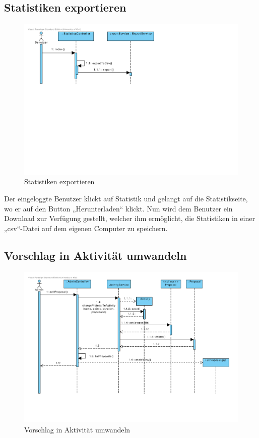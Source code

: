 \subsection{Statistiken exportieren}

\begin{figure}[H]
  \centering
  \includegraphics[width=\textwidth, clip]{gfx/statistiken_exportieren}
  \caption{Statistiken exportieren}
\end{figure}

Der eingeloggte Benutzer klickt auf Statistik und gelangt auf die
Statistikseite, wo er auf den Button „Herunterladen“ klickt. Nun wird
dem Benutzer ein Download zur Verfügung gestellt, welcher ihm
ermöglicht, die Statistiken in einer „csv“-Datei auf dem eigenen
Computer zu speichern.

\subsection{Vorschlag in Aktivität umwandeln}

\begin{figure}[H]
  \centering
  \includegraphics[width=\textwidth, clip]{gfx/vorschlag_in_aktivitaet_umwandeln}
  \caption{Vorschlag in Aktivität umwandeln}
\end{figure}

